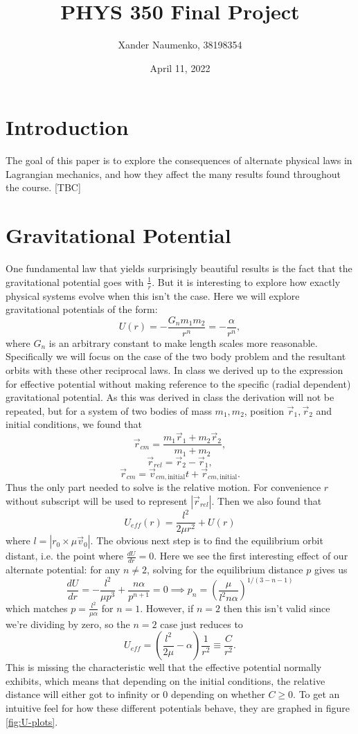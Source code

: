 \documentclass[letterpaper, reqno,11pt]{article}
\begin{document}
\title{PHYS 350 Final Project}
\date{April 11, 2022}
\author{Xander Naumenko, 38198354}
\maketitle

\tableofcontents

\section{Introduction}
 
The goal of this paper is to explore the consequences of alternate physical laws in Lagrangian mechanics, and how they affect the many results found throughout the course. [TBC]

\section{Gravitational Potential}

One fundamental law that yields surprisingly beautiful results is the fact that the gravitational potential goes with $\frac{1}{r}$. But it is interesting to explore how exactly physical systems evolve when this isn't the case. Here we will explore gravitational potentials of the form: 
\[
U(r)=-\frac{G_nm_1m_2}{r^{n}}=-\frac{\alpha}{r^{n}}
,\]
where $G_n$ is an arbitrary constant to make length scales more reasonable. Specifically we will focus on the case of the two body problem and the resultant orbits with these other reciprocal laws. In class we derived up to the expression for effective potential without making reference to the specific (radial dependent) gravitational potential. As this was derived in class the derivation will not be repeated, but for a system of two bodies of mass $ m_1, m_2$, position $\vec r_1, \vec r_2$ and initial conditions, we found that 
\[
\vec r_{cm}=\frac{m_1\vec r_1+m_2\vec r_2}{m_1+m_2}
,\]
\[
\vec r_{rel}=\vec r_2-\vec r_1
,\]
\[
\vec r_{cm}=\vec v_{cm, \text{initial}}t+\vec r_{cm, \text{initial}}
.\]
Thus the only part needed to solve is the relative motion. For convenience $r$ without subscript will be used to represent $|\vec r_{rel}|$. Then we also found that 
 \[
U_{eff}(r)=\frac{l^2}{2\mu r^2}+U(r)
\]
where $l=\left| r_0\times \mu\vec v_0 \right| $. The obvious next step is to find the equilibrium orbit distant, i.e. the point where $\frac{dU}{dr}=0$. Here we see the first interesting effect of our alternate potential: for any $n\neq 2$, solving for the equilibrium distance $p$ gives us
\[
\frac{dU}{dr}=-\frac{l^2}{\mu p^3}+\frac{n\alpha}{p^{n+1}}=0\implies p_n=\left( \frac{\mu}{l^2 n\alpha} \right)^{1 /(3-n-1)}
\]
which matches $p=\frac{l^2}{\mu\alpha}$ for $n=1$. However, if $n=2$ then this isn't valid since we're dividing by zero, so the $n=2$ case just reduces to
\[
U_{eff}=\left( \frac{l^2}{2\mu}-\alpha \right)\frac{1}{r^2}\equiv \frac{C}{r^2}
.\]
This is missing the characteristic well that the effective potential normally exhibits, which means that depending on the initial conditions, the relative distance will either got to infinity or $0$ depending on whether $C\geq 0$. To get an intuitive feel for how these different potentials behave, they are graphed in figure \ref{fig:U-plots}. 
\end{document}
